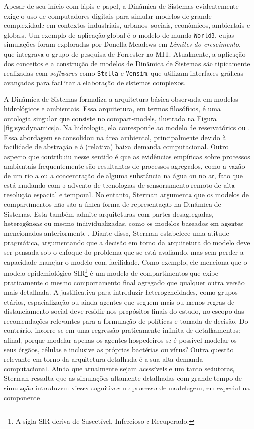 \documentclass[./main.tex]{subfiles}
\begin{document}
\noindent Apesar de seu início com lápis e papel, a Dinâmica de Sistemas evidentemente exige o uso de computadores digitais para simular modelos de grande complexidade em contextos industriais, urbanos, sociais, econômicos, ambientais e globais. Um exemplo de aplicação global é o modelo de mundo \texttt{World3}, cujas simulações foram exploradas por Donella Meadows em \textit{Limites do crescimento}, que integrava o grupo de pesquisa de Forrester no MIT. Atualmente, a aplicação dos conceitos e a construção de modelos de Dinâmica de Sistemas são tipicamente realizadas com \textit{softwares} como \texttt{Stella} e \texttt{Vensim}, que utilizam interfaces gráficas avançadas para facilitar a elaboração de sistemas complexos.

\par A Dinâmica de Sistemas formaliza a arquitetura básica observada em modelos hidrológicos e ambientais. Essa arquitetura, em termos filosóficos, é uma ontologia singular que consiste no \gls{compart-models}, ilustrada na Figura \ref{fig:sys:dynamics}a. Na hidrologia, ela corresponde ao modelo de reservatórios ou . Essa abordagem se consolidou na área ambiental, principalmente devido à facilidade de abstração e à (relativa) baixa demanda computacional. Outro aspecto que contribuiu nesse sentido é que as evidências empíricas sobre processos ambientais frequentemente são resultantes de processos agregados, como a vazão de um rio a ou a concentração de alguma substância na água ou no ar, fato que está mudando com o advento de tecnologias de sensoriamento remoto de alta resolução espacial e temporal. No entanto, Sterman argumenta que os modelos de compartimentos não são a única forma de representação na Dinâmica de Sistemas. Esta também admite arquiteturas com partes desagregadas, heterogêneas ou mesmo individualizadas, como os modelos baseados em agentes mencionados anteriormente \cite{sterman2018}. Diante disso, Sterman estabelece uma atitude pragmática, argumentando que a decisão em torno da arquitetura do modelo deve ser pensada sob o enfoque do problema que se está avaliando, mas sem perder a capacidade manejar o modelo com facilidade. Como exemplo, ele menciona que o modelo epidemiológico SIR\footnote{A sigla SIR deriva de Suscetível, Infeccioso e Recuperado.} é um modelo de compartimentos que exibe praticamente o mesmo comportamento final agregado que qualquer outra versão mais detalhada. A justificativa para introduzir heterogeneidades, como grupos etários, espacialização ou ainda agentes que seguem mais ou menos regras de distanciamento social deve residir nos propósitos finais do estudo, no escopo das recomendações relevantes para a formulação de políticas e tomada de decisão. Do contrário, incorre-se em uma regressão praticamente infinita de detalhamentos: afinal, porque modelar apenas os agentes hospedeiros se é possível modelar os seus órgãos, células e inclusive as próprias bactérias ou vírus? Outra questão relevante em torno da arquitetura detalhada é a sua alta demanda computacional. Ainda que atualmente sejam acessíveis e um tanto sedutoras, Sterman ressalta que as simulações altamente detalhadas com grande tempo de simulação introduzem vieses cognitivos no processo de modelagem, em especial na componente 
\end{document}
